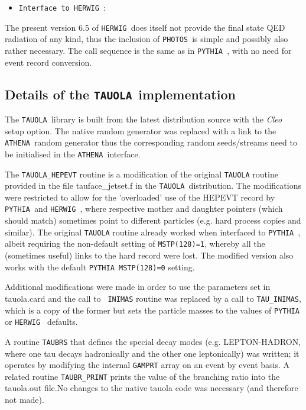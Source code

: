 \documentclass[a4paper,12pt]{article}
\newcommand{\athena}{{\tt ATHENA }}
\newcommand{\pythia}{{\tt PYTHIA }}
\newcommand{\herwig}{{\tt HERWIG }}
\newcommand{\tauola}{{\tt TAUOLA }}
\newcommand{\photos}{{\tt PHOTOS }}
\begin{document}
\begin{itemize}
\item{\tt Interface to \herwig}:
\end{itemize}
The present version 6.5 of \herwig does itself not provide the final state QED
radiation of any kind, thus the inclusion of \photos is simple and possibly also
rather necessary. The call sequence is the same as in \pythia, with no
need for event record conversion. 


\boldmath 
\subsection{Details of the \tauola implementation}
\unboldmath

The \tauola library is built from the latest distribution source with the {\it
Cleo} setup option. The native random generator was replaced with a link to the
\athena random generator thus the corresponding random seeds/streams need to be
initialised in the \athena interface.

The {\tt TAUOLA\_HEPEVT} routine is a modification
of the original {\tt TAUOLA} routine provided in the file {\sf tauface\_jetset.f}
in the \tauola distribution. The modifications were restricted to allow for the
'overloaded' use of the HEPEVT record by \pythia and \herwig, where respective mother
and daughter pointers (which should match) sometimes point to different
particles (e.g. hard process copies and similar). The original {\tt TAUOLA}
routine already worked when interfaced to \pythia, albeit requiring the
non-default setting of {\tt MSTP(128)=1}, whereby all the (sometimes useful)
links to the hard record were lost. The modified version also works with the
default \pythia {\tt MSTP(128)=0} setting. 

Additional modifications were made in
order to use the parameters set in {\sf tauola.card} and the call to {\tt
INIMAS} routine was replaced by a call to {\tt TAU\_INIMAS}, which is a copy of
the former but sets the particle masses to the values of \pythia or \herwig
defaults. 

A routine {\tt TAUBRS} that defines the special decay modes (e.g. LEPTON-HADRON,
where one tau decays hadronically and the other one leptonically) was written;
it operates by modifying the internal {\tt GAMPRT} array on an event by event
basis. A related routine {\tt TAUBR\_PRINT} prints the value of the branching
ratio into the {\sf tauola.out} file.No changes to the native tauola code was 
necessary (and therefore not made). 
\end{document}
